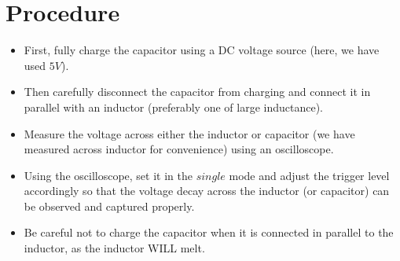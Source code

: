 \documentclass[a4paper,12pt]{article}
\begin{document}
\section{Procedure}
\begin{itemize}
    \item First, fully charge the capacitor using a DC voltage source (here, we have used $5V$).
    \item Then carefully disconnect the capacitor from charging and connect it in parallel with an inductor (preferably one of large inductance). 
    \item Measure the voltage across either the inductor or capacitor (we have measured across inductor for convenience) using an oscilloscope. 
    \item Using the oscilloscope, set it in the $single$ mode and adjust the trigger level accordingly so that the voltage decay across the inductor (or capacitor) can be observed and captured properly. 
    \item Be careful not to charge the capacitor when it is connected in parallel to the inductor, as the inductor WILL melt.
\end{itemize}
\end{document}
